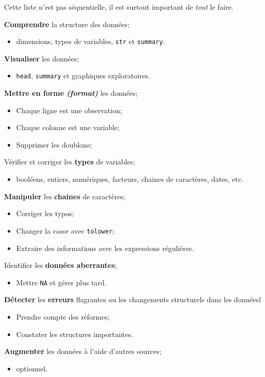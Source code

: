 \documentclass[10pt, french]{article}
\begin{document}
\begin{multicols*}{3}
\begin{algo2}
Cette liste n'est pas séquentielle, il est surtout important de \textit{tout} le faire.
\begin{todolist}[leftmargin = *]
	\item	\textbf{Comprendre} la structure des données;
		\begin{itemize}
		\item	dimensions, types de variables, \texttt{str} et \texttt{summary}.
		\end{itemize}
	\item	\textbf{Visualiser} les données;
		\begin{itemize}
		\item	\texttt{head}, \texttt{summary} et graphiques exploratoires.
		\end{itemize}
	\item	\textbf{Mettre en forme \textit{(format)}} les données;
		\begin{itemize}
		\item	Chaque ligne est une observation;
		\item	Chaque colonne est une variable;
		\item	Supprimer les doublons;
		\end{itemize}
	\item	Vérifier et corriger les \textbf{types} de variables;
		\begin{itemize}
		\item	booléens, entiers, numériques, facteurs, chaines de caractères, dates, etc.
		\end{itemize}
	\item	\textbf{Manipuler} les \textbf{chaines} de caractères;
		\begin{itemize}
		\item	Corriger les typos;
		\item	Changer la casse avec \texttt{tolower};
		\item	Extraire des informations avec les expressions régulières.
		\end{itemize}
	\item	Identifier les \textbf{données aberrantes};
		\begin{itemize}
		\item	Mettre \texttt{NA} et gérer plus tard.
		\end{itemize}
	\item	\textbf{Détecter} les \textbf{erreurs} flagrantes ou les changements structurels dans les donnéesl
		\begin{itemize}
		\item	Prendre compte des réformes;
		\item	Constater les structures importantes.
		\end{itemize}
	\item	\textbf{Augmenter} les données à l'aide d'autres sources;
		\begin{itemize}
		\item	optionnel.
		\end{itemize}
\end{todolist}
\end{algo2}


\end{multicols*}
\end{document}
